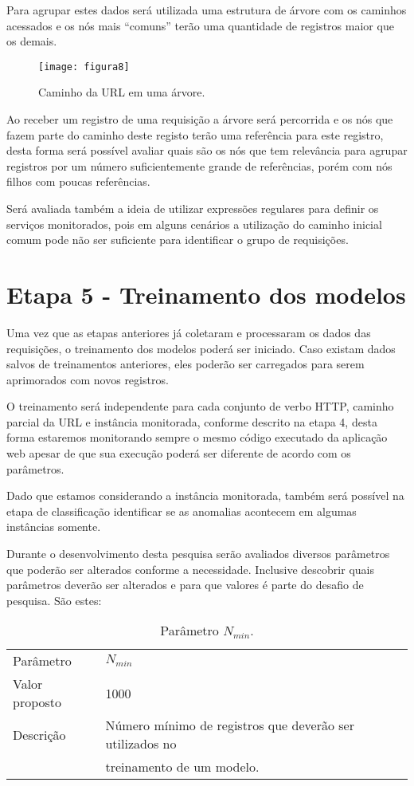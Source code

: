 Para agrupar estes dados será utilizada uma estrutura de árvore com os caminhos
acessados e os nós mais ``comuns'' terão uma quantidade de registros maior que os
demais.

\begin{figure}
  \centering
  \texttt{[image: figura8]}
  \caption{Caminho da URL em uma árvore.\label{fig:caminho-da-url-em-uma-arvore}}
\end{figure}

Ao receber um registro de uma requisição a árvore será percorrida e os nós que
fazem parte do caminho deste registo terão uma referência para este registro,
desta forma será possível avaliar quais são os nós que tem relevância para agrupar
registros por um número suficientemente grande de referências, porém com nós filhos
com poucas referências.

Será avaliada também a ideia de utilizar expressões regulares para definir os
serviços monitorados, pois em alguns cenários a utilização do caminho inicial comum
pode não ser suficiente para identificar o grupo de requisições.

\section{Etapa 5 - Treinamento dos modelos}
\label{sec:etapa-5}

Uma vez que as etapas anteriores já coletaram e processaram os dados das requisições,
o treinamento dos modelos poderá ser iniciado. Caso existam dados salvos de
treinamentos anteriores, eles poderão ser carregados para serem aprimorados com
novos registros.

O treinamento será independente para cada conjunto de verbo HTTP, caminho parcial da
URL e instância monitorada, conforme descrito na etapa 4, desta forma estaremos
monitorando sempre o mesmo código executado da aplicação web apesar de que sua
execução poderá ser diferente de acordo com os parâmetros.

Dado que estamos considerando a instância monitorada, também será possível na etapa
de classificação identificar se as anomalias acontecem em algumas instâncias somente. 

Durante o desenvolvimento desta pesquisa serão avaliados diversos parâmetros que
poderão ser alterados conforme a necessidade. Inclusive descobrir quais parâmetros
deverão ser alterados e para que valores é parte do desafio de pesquisa. São estes:

\begin{table}[H]
\caption{Parâmetro $N_{min}$.}
\vspace{0.25cm}
\begin{tabular}{ll}
Parâmetro      & $N_{min}$ \\
Valor proposto & 1000 \\
Descrição      & Número mínimo de registros que deverão ser utilizados no \\
               & treinamento de um modelo.
\end{tabular}
\end{table}

